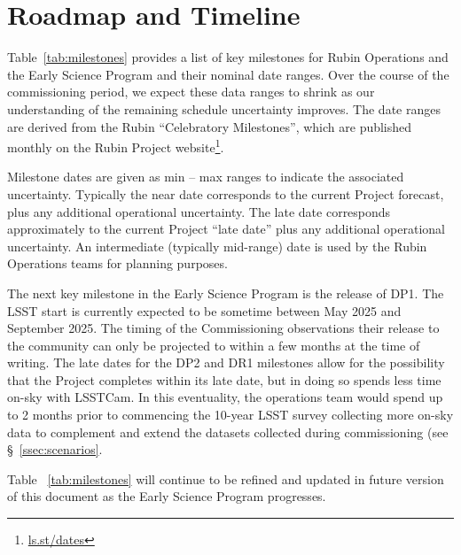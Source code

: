 \section{Roadmap and Timeline} \label{sec:timeline}

Table~\ref{tab:milestones} provides a list of key milestones for Rubin Operations and the Early Science Program and their nominal date ranges.
Over the course of the commissioning period, we expect these data ranges to shrink as our understanding of the remaining schedule uncertainty improves. 
The date ranges are derived from the Rubin ``Celebratory Milestones'', which are  published monthly on the Rubin Project website\footnote{\url{ls.st/dates}}. 



Milestone dates are given as min -- max ranges to indicate the associated uncertainty. 
Typically the near date corresponds to the current Project forecast, plus any additional operational uncertainty.
The late date corresponds approximately to the current Project ``late date'' plus any additional operational uncertainty.
An intermediate (typically mid-range) date is used by the Rubin Operations teams for planning purposes. 

The next key milestone in the Early Science Program is the release of DP1.
The LSST start is currently expected to be sometime between May 2025 and September 2025.
The timing of the Commissioning observations their release to the community can only be projected to within a few months at the time of writing.
The late dates for the DP2 and DR1 milestones allow for the possibility that the Project completes within its late date, but in doing so spends less time on-sky with LSSTCam.
In this eventuality, the operations team would spend up to 2 months prior to commencing the 10-year LSST survey collecting more on-sky data to complement and extend the datasets collected during commissioning (see \S~\ref{ssec:scenarios}. 

Table ~\ref{tab:milestones} will continue to be refined and updated in future version of this document as the Early Science Program progresses.